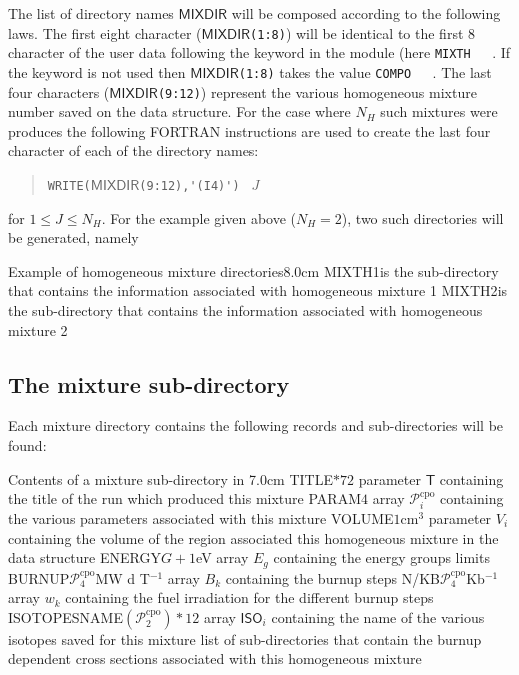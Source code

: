 The list of directory  names $\mathsf{MIXDIR}$ will be composed according to the following
laws. The first eight character ($\mathsf{MIXDIR}$\verb*|(1:8)|) will be identical to the first 8 character
of the user data following the keyword  in the  module (here \verb*|MIXTH   |. If the
keyword  is not used then $\mathsf{MIXDIR}$\verb*|(1:8)| takes the value \verb*|COMPO   |. The last
four characters   ($\mathsf{MIXDIR}$\verb*|(9:12)|) represent the various homogeneous mixture number saved on
the  data structure. For the case where $N_{H}$ such mixtures were produces the following
FORTRAN instructions are used to create the last four character of each of the directory names:
\begin{quote}
\verb|WRITE(|$\mathsf{MIXDIR}$\verb|(9:12),'(I4)') | $J$
\end{quote} 
  for $1\leq J \leq N_{H}$. For the example given above ($N_{H}=2$), two such directories will be
generated, namely

\begin{DescriptionEnregistrement}{Example of homogeneous mixture directories}{8.0cm}
\DirEnr
  {MIXTH1}{is the sub-directory that contains the information associated with
   homogeneous mixture 1}
\DirEnr
  {MIXTH2}{is the sub-directory that contains the information associated with
   homogeneous mixture 2}
\end{DescriptionEnregistrement}

\subsection{The mixture sub-directory}\label{sect:cpodirmixture}

Each mixture directory contains the following records and sub-directories will be found:

\begin{DescriptionEnregistrement}{Contents of a mixture sub-directory in }{7.0cm}
\CharEnr
  {TITLE}{$*72$}
  {parameter $\mathsf{T}$ containing the title of the run which produced this mixture}
\IntEnr
  {PARAM}{$4$}
  {array $\mathcal{P}^{\text{cpo}}_{i}$ containing the various parameters associated with this mixture}
\RealEnr
  {VOLUME}{$1$}{cm$^{3}$}
  {parameter $V_{i}$ containing the volume of the region associated this homogeneous mixture in
   the  data structure}
\RealEnr
  {ENERGY}{$G+1$}{eV}
  {array $E_{g}$ containing the energy groups limits}
\RealEnr
  {BURNUP}{$\mathcal{P}^{\text{cpo}}_{4}$}{MW d T$^{-1}$}
  {array $B_{k}$ containing the burnup steps}
\RealEnr
  {N/KB}{$\mathcal{P}^{\text{cpo}}_{4}$}{Kb$^{-1}$}
  {array $w_{k}$ containing the fuel irradiation for the different burnup steps}
\CharEnr
  {ISOTOPESNAME}{$(\mathcal{P}^{\text{cpo}}_{2})*12$}
  {array  $\mathsf{ISO}_{i}$ containing the name of the various isotopes saved for this mixture}
\DirVar
  {}
  {list of sub-directories that contain the burnup dependent cross sections associated
   with this homogeneous mixture}
\end{DescriptionEnregistrement}

